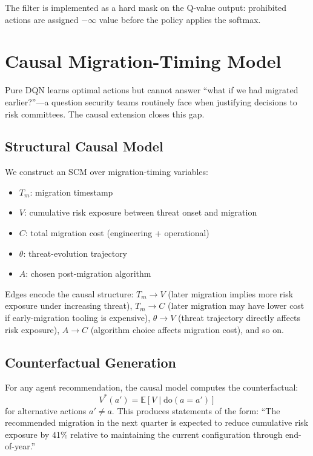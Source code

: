 \documentclass[sigconf,nonacm]{acmart}
\begin{document}
The filter is implemented as a hard mask on the Q-value output: prohibited
actions are assigned $-\infty$ value before the policy applies the
softmax.

\section{Causal Migration-Timing Model}

Pure DQN learns optimal actions but cannot answer ``what if we had
migrated earlier?''---a question security teams routinely face when
justifying decisions to risk committees. The causal extension closes
this gap.

\subsection{Structural Causal Model}

We construct an SCM over migration-timing variables:

\begin{itemize}
  \item $T_m$: migration timestamp
  \item $V$: cumulative risk exposure between threat onset and migration
  \item $C$: total migration cost (engineering + operational)
  \item $\theta$: threat-evolution trajectory
  \item $A$: chosen post-migration algorithm
\end{itemize}

Edges encode the causal structure: $T_m \to V$ (later migration
implies more risk exposure under increasing threat), $T_m \to C$
(later migration may have lower cost if early-migration tooling is
expensive), $\theta \to V$ (threat trajectory directly affects risk
exposure), $A \to C$ (algorithm choice affects migration cost), and
so on.

\subsection{Counterfactual Generation}

For any agent recommendation, the causal model computes the
counterfactual:
\begin{equation}
  V^*(a') = \mathbb{E}[V \mid \mathrm{do}(a = a')]
\end{equation}
for alternative actions $a' \neq a$. This produces statements of the
form: ``The recommended migration in the next quarter is expected to
reduce cumulative risk exposure by 41\% relative to maintaining the
current configuration through end-of-year.''
\end{document}
